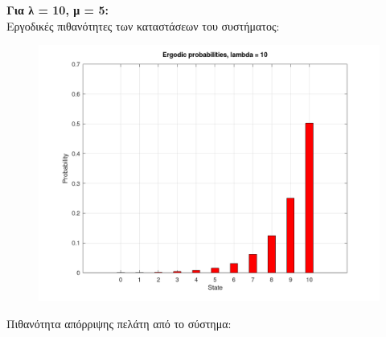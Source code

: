 \documentclass[a4paper]{article}
\begin{document}
\begin{minipage}{\textwidth}
\textbf{Για λ = 10, μ = 5:} \\

Εργοδικές πιθανότητες των καταστάσεων του συστήματος:



\begin{figure}[H]
	\includegraphics[width=\textwidth]{images/prob3.png}
\end{figure}

Πιθανότητα απόρριψης πελάτη από το σύστημα:



\end{minipage}
\end{document}

